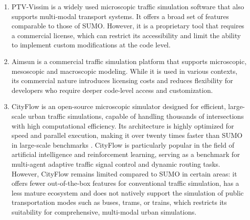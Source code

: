 \begin{enumerate}
    \item PTV-Vissim  is a widely used microscopic traffic simulation software that also supports multi-modal transport systems. It offers a broad set of features comparable to those of SUMO. However, it is a proprietary tool that requires a commercial license, which can restrict its accessibility and limit the ability to implement custom modifications at the code level.
    \item Aimsun is a commercial traffic simulation platform that supports microscopic, mesoscopic and macroscopic modeling. While it is used in various contexts, its commercial nature introduces licensing costs and reduces flexibility for developers who require deeper code-level access and customization.
    \item CityFlow \cite{cityflow} is an open-source microscopic simulator designed for efficient, large-scale urban traffic simulations, capable of handling thousands of intersections with high computational efficiency. Its architecture is highly optimized for speed and parallel execution, making it over twenty times faster than SUMO in large-scale benchmarks \cite{cityflow_rl}. CityFlow is particularly popular in the field of artificial intelligence and reinforcement learning, serving as a benchmark for multi-agent adaptive traffic signal control and dynamic routing tasks. However, CityFlow remains limited compared to SUMO in certain areas: it offers fewer out-of-the-box features for conventional traffic simulation, has a less mature ecosystem and does not natively support the simulation of public transportation modes such as buses, trams, or trains, which restricts its suitability for comprehensive, multi-modal urban simulations.
\end{enumerate}

